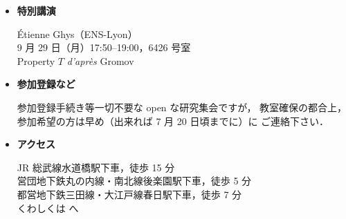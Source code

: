 \documentclass[uplatex,a4paper]{jsarticle}
\newcommand{\bul}{$\bullet$}
\begin{document}
\begin{itemize}
{\bf Schweitzer S.J., Paul A.（PUC-Rio）：}\vspace{1mm}

\hspace{5mm}I．Gel'fand-Fuks コホモロジー入門\\
\hspace{5mm}II．単射性予想
\vspace{2mm}

{\bf Sergiescu, Vlad（Grenoble 大学）：}\vspace{1mm}

\hspace{5mm}I．P. Greenberg による PL 葉層の研究\\
\hspace{5mm}II．インフォーマルセミナー
\vspace{2mm}

{\bf Tsuboi, Takashi（東京大学）：}\vspace{1mm}

\hspace{5mm}I．Mather-Thurston 理論入門\\
\hspace{5mm}II．低微分可能性における連結性
\vspace{2mm}

{\bf Vogt, Elmar（Berlin 自由大学）：}\vspace{1mm}

\hspace{5mm}I．Segal および Moerdijk による $B\Gamma$ の構成\\
\hspace{5mm}II．$B\Gamma$ の可微分コホモロジー\\
\hspace{5mm}III．実ホモトピー理論
\vspace{3mm}

\item[\bul] {\bf 特別講演}

\'Etienne Ghys（ENS-Lyon）\\
9 月 29 日（月）17:50--19:00，6426 号室\\
\hspace{5mm}Property $T$ \textit{d'apr\`{e}s} Gromov

\item[\bul] {\bf 参加登録など}

参加登録手続き等一切不要な open な研究集会ですが，
教室確保の都合上，参加希望の方は早め（出来れば 7 月 20 日頃までに）に
ご連絡下さい．

\item[\bul] \hypertarget{Access}{{\bf アクセス}}

JR 総武線水道橋駅下車，徒歩 15 分\\
営団地下鉄丸の内線・南北線後楽園駅下車，徒歩 5 分\\
都営地下鉄三田線・大江戸線春日駅下車，徒歩 7 分\\
くわしくは
\href{http://www.chuo-u.ac.jp/chuo-u/access/access_guid.html}{}
へ

\end{itemize}
\end{document}
